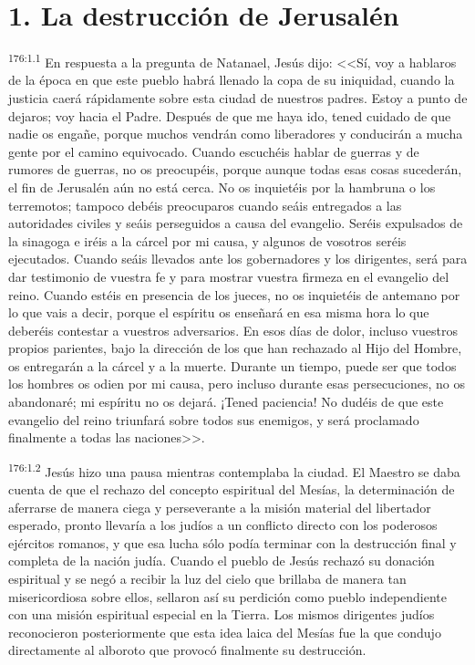 \section*{1. La destrucción de Jerusalén}
\par 
\textsuperscript{176:1.1} En respuesta a la pregunta de Natanael, Jesús dijo: <<Sí, voy a hablaros de la época en que este pueblo habrá llenado la copa de su iniquidad, cuando la justicia caerá rápidamente sobre esta ciudad de nuestros padres. Estoy a punto de dejaros; voy hacia el Padre. Después de que me haya ido, tened cuidado de que nadie os engañe, porque muchos vendrán como liberadores y conducirán a mucha gente por el camino equivocado. Cuando escuchéis hablar de guerras y de rumores de guerras, no os preocupéis, porque aunque todas esas cosas sucederán, el fin de Jerusalén aún no está cerca. No os inquietéis por la hambruna o los terremotos; tampoco debéis preocuparos cuando seáis entregados a las autoridades civiles y seáis perseguidos a causa del evangelio. Seréis expulsados de la sinagoga e iréis a la cárcel por mi causa, y algunos de vosotros seréis ejecutados. Cuando seáis llevados ante los gobernadores y los dirigentes, será para dar testimonio de vuestra fe y para mostrar vuestra firmeza en el evangelio del reino. Cuando estéis en presencia de los jueces, no os inquietéis de antemano por lo que vais a decir, porque el espíritu os enseñará en esa misma hora lo que deberéis contestar a vuestros adversarios. En esos días de dolor, incluso vuestros propios parientes, bajo la dirección de los que han rechazado al Hijo del Hombre, os entregarán a la cárcel y a la muerte. Durante un tiempo, puede ser que todos los hombres os odien por mi causa, pero incluso durante esas persecuciones, no os abandonaré; mi espíritu no os dejará. ¡Tened paciencia! No dudéis de que este evangelio del reino triunfará sobre todos sus enemigos, y será proclamado finalmente a todas las naciones>>.

\par 
\textsuperscript{176:1.2} Jesús hizo una pausa mientras contemplaba la ciudad. El Maestro se daba cuenta de que el rechazo del concepto espiritual del Mesías, la determinación de aferrarse de manera ciega y perseverante a la misión material del libertador esperado, pronto llevaría a los judíos a un conflicto directo con los poderosos ejércitos romanos, y que esa lucha sólo podía terminar con la destrucción final y completa de la nación judía. Cuando el pueblo de Jesús rechazó su donación espiritual y se negó a recibir la luz del cielo que brillaba de manera tan misericordiosa sobre ellos, sellaron así su perdición como pueblo independiente con una misión espiritual especial en la Tierra. Los mismos dirigentes judíos reconocieron posteriormente que esta idea laica del Mesías fue la que condujo directamente al alboroto que provocó finalmente su destrucción.

